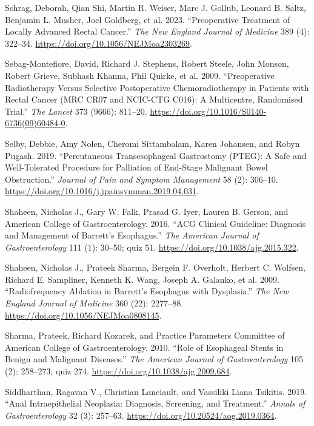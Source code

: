 \documentclass[
  letterpaper,
]{scrbook}
\newlength{\cslhangindent}
\newenvironment{CSLReferences}[2] %
 {\begin{list}{}{%
  \setlength{\itemindent}{0pt}
  \setlength{\leftmargin}{0pt}
  \setlength{\parsep}{0pt}
  \ifodd #1
   \setlength{\leftmargin}{\cslhangindent}
   \setlength{\itemindent}{-1\cslhangindent}
  \fi
  \setlength{\itemsep}{#2\baselineskip}}}
 {\end{list}}
\begin{document}
\begin{CSLReferences}{1}{0}
Schrag, Deborah, Qian Shi, Martin R. Weiser, Marc J. Gollub, Leonard B.
Saltz, Benjamin L. Musher, Joel Goldberg, et al. 2023. {``Preoperative
{Treatment} of {Locally} {Advanced} {Rectal} {Cancer}.''} \emph{The New
England Journal of Medicine} 389 (4): 322--34.
\url{https://doi.org/10.1056/NEJMoa2303269}.

Sebag-Montefiore, David, Richard J. Stephens, Robert Steele, John
Monson, Robert Grieve, Subhash Khanna, Phil Quirke, et al. 2009.
{``Preoperative Radiotherapy Versus Selective Postoperative
Chemoradiotherapy in Patients with Rectal Cancer ({MRC} {CR07} and
{NCIC}-{CTG} {C016}): A Multicentre, Randomised Trial.''} \emph{The
Lancet} 373 (9666): 811--20.
\url{https://doi.org/10.1016/S0140-6736(09)60484-0}.

Selby, Debbie, Amy Nolen, Cheromi Sittambalam, Karen Johansen, and Robyn
Pugash. 2019. {``Percutaneous {Transesophageal} {Gastrostomy} ({PTEG}):
{A} {Safe} and {Well}-{Tolerated} {Procedure} for {Palliation} of
{End}-{Stage} {Malignant} {Bowel} {Obstruction}.''} \emph{Journal of
Pain and Symptom Management} 58 (2): 306--10.
\url{https://doi.org/10.1016/j.jpainsymman.2019.04.031}.

Shaheen, Nicholas J., Gary W. Falk, Prasad G. Iyer, Lauren B. Gerson,
and American College of Gastroenterology. 2016. {``{ACG} {Clinical}
{Guideline}: {Diagnosis} and {Management} of {Barrett}'s {Esophagus}.''}
\emph{The American Journal of Gastroenterology} 111 (1): 30--50; quiz
51. \url{https://doi.org/10.1038/ajg.2015.322}.

Shaheen, Nicholas J., Prateek Sharma, Bergein F. Overholt, Herbert C.
Wolfsen, Richard E. Sampliner, Kenneth K. Wang, Joseph A. Galanko, et
al. 2009. {``Radiofrequency Ablation in {Barrett}'s Esophagus with
Dysplasia.''} \emph{The New England Journal of Medicine} 360 (22):
2277--88. \url{https://doi.org/10.1056/NEJMoa0808145}.

Sharma, Prateek, Richard Kozarek, and Practice Parameters Committee of
American College of Gastroenterology. 2010. {``Role of Esophageal Stents
in Benign and Malignant Diseases.''} \emph{The American Journal of
Gastroenterology} 105 (2): 258--273; quiz 274.
\url{https://doi.org/10.1038/ajg.2009.684}.

Siddharthan, Ragavan V., Christian Lanciault, and Vassiliki Liana
Tsikitis. 2019. {``Anal Intraepithelial Neoplasia: Diagnosis, Screening,
and Treatment.''} \emph{Annals of Gastroenterology} 32 (3): 257--63.
\url{https://doi.org/10.20524/aog.2019.0364}.


\end{CSLReferences}
\end{document}

